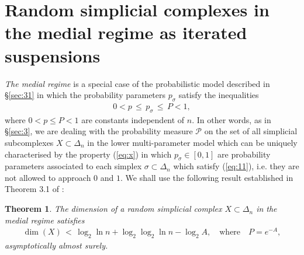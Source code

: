 \documentclass[11pt,twoside, reqno]{amsart}
\theoremstyle{plain}
\newtheorem{teo}[lema]{Theorem}
\theoremstyle{definition}
\begin{document}
\section{Random simplicial complexes in the medial regime as iterated suspensions}









{\it The medial regime} \cite{FM} is a special case of the probabilistic model described in \S \ref{sec:31} in which the probability parameters $p_\sigma$ satisfy the inequalities
\begin{eqnarray}\label{eq:11}
0<p\, \le\, p_\sigma\, \le\,  P<1,
\end{eqnarray}
where $0<p\le P<1$ are constants independent of $n$. 
In other words, as in \S \ref{sec:3}, we are dealing with the probability measure $\mathcal P$ on the set of all simplicial subcomplexes $X\subset \Delta_n$ in the lower multi-parameter model which can be uniquely characterised by the property (\ref{eq:x}) in which $p_\sigma\in [0,1]$ are probability parameters associated to each simplex $\sigma\subset \Delta_n$ which satisfy (\ref{eq:11}), i.e. they are not allowed to approach $0$ and $1$. 
We shall use the following result established in Theorem 3.1 of \cite{FM}:
\begin{teo}\label{thm10}
The dimension of a random simplicial complex $X\subset \Delta_n$ in the medial regime satisfies 
\begin{eqnarray*}\label{dimupper1}
\dim(X)  \, < \,  \log_2\ln n +\log_2\log_2\ln n- \log_2 A, \quad \mbox{where}\quad P=e^{-A},
\end{eqnarray*}
asymptotically almost surely.
\end{teo}
\end{document}
